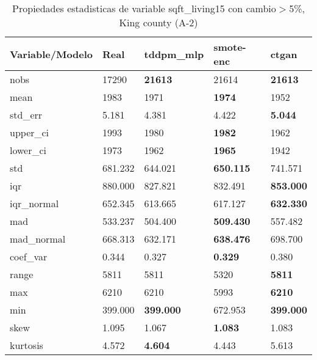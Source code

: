 \begin{table}[H]
\centering
\fontsize{8}{14}\selectfont
\caption{Propiedades estadisticas de variable sqft\_living15 con cambio\ensuremath{>}5\%, King county (A-2)}
\label{table-stats-king county-a-2-sqft_living15-short}
\begin{tabular}{|l|m{10em}|m{10em}|m{10em}|m{10em}|}
\hline
 \rowcolor[gray]{0.8}
Variable/Modelo & Real & tddpm\_mlp & smote-enc & ctgan \\
\hline nobs & 17290 & \bfseries 21613 & \cellcolor[rgb]{0.9, 0.54, 0.52} 21614 & \bfseries 21613 \\
\hline mean & 1983 & 1971 & \bfseries 1974 & \cellcolor[rgb]{0.9, 0.54, 0.52} 1952 \\
\hline std\_err & 5.181 & \cellcolor[rgb]{0.9, 0.54, 0.52} 4.381 & 4.422 & \bfseries 5.044 \\
\hline upper\_ci & 1993 & 1980 & \bfseries 1982 & \cellcolor[rgb]{0.9, 0.54, 0.52} 1962 \\
\hline lower\_ci & 1973 & 1962 & \bfseries 1965 & \cellcolor[rgb]{0.9, 0.54, 0.52} 1942 \\
\hline std & 681.232 & 644.021 & \bfseries 650.115 & \cellcolor[rgb]{0.9, 0.54, 0.52} 741.571 \\
\hline iqr & 880.000 & \cellcolor[rgb]{0.9, 0.54, 0.52} 827.821 & 832.491 & \bfseries 853.000 \\
\hline iqr\_normal & 652.345 & \cellcolor[rgb]{0.9, 0.54, 0.52} 613.665 & 617.127 & \bfseries 632.330 \\
\hline mad & 533.237 & \cellcolor[rgb]{0.9, 0.54, 0.52} 504.400 & \bfseries 509.430 & 557.482 \\
\hline mad\_normal & 668.313 & \cellcolor[rgb]{0.9, 0.54, 0.52} 632.171 & \bfseries 638.476 & 698.700 \\
\hline coef\_var & 0.344 & 0.327 & \bfseries 0.329 & \cellcolor[rgb]{0.9, 0.54, 0.52} 0.380 \\
\hline range & 5811 & 5811 & \cellcolor[rgb]{0.9, 0.54, 0.52} 5320 & \bfseries 5811 \\
\hline max & 6210 & 6210 & \cellcolor[rgb]{0.9, 0.54, 0.52} 5993 & \bfseries 6210 \\
\hline min & 399.000 & \bfseries 399.000 & \cellcolor[rgb]{0.9, 0.54, 0.52} 672.953 & \bfseries 399.000 \\
\hline skew & 1.095 & \cellcolor[rgb]{0.9, 0.54, 0.52} 1.067 & \bfseries 1.083 & 1.083 \\
\hline kurtosis & 4.572 & \bfseries 4.604 & 4.443 & \cellcolor[rgb]{0.9, 0.54, 0.52} 5.613 \\

\end{tabular}
\end{table}
